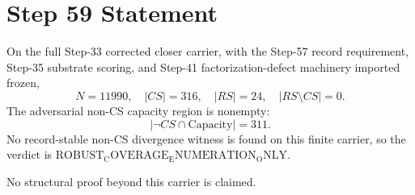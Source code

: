 \documentclass[11pt]{article}
\begin{document}
\section*{Step 59 Statement}
On the full Step-33 corrected closer carrier, with the Step-57 record requirement, Step-35 substrate scoring, and Step-41 factorization-defect machinery imported frozen,
\[
  N=11990,\quad |CS|=316,\quad |RS|=24,\quad |RS\setminus CS|=0.
\]
The adversarial non-CS capacity region is nonempty:
\[
  |\neg CS \cap \mathrm{Capacity}|=311.
\]
No record-stable non-CS divergence witness is found on this finite carrier, so the verdict is \(\mathrm{ROBUST_COVERAGE_ENUMERATION_ONLY}\).

No structural proof beyond this carrier is claimed.
\end{document}
